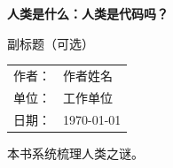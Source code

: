 \begin{titlepage}
    \vspace*{2cm}
    {\heiti\bfseries 人类是什么：人类是代码吗？\par}
    \vspace{3cm}
    {\kaishu 副标题（可选）\par}
    \vspace{5cm}
    {
    \begin{tabular}{ll}
        作者： & 作者姓名 \\
        单位： & 工作单位 \\
        日期： & \today
    \end{tabular}\par}
    \vspace{3cm}
    {\songti 本书系统梳理人类之谜。\par}
\end{titlepage}
\thispagestyle{empty}
\newpage
\thispagestyle{empty}
\ \thispagestyle{empty}
